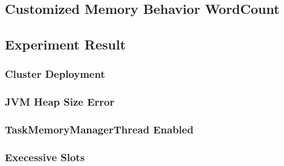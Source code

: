 \subsection{Customized Memory Behavior WordCount}


\subsection{Experiment Result}

\subsubsection{Cluster Deployment}


\subsubsection{JVM Heap Size Error}


\subsubsection{TaskMemoryManagerThread Enabled}


\subsubsection{Execessive Slots}
